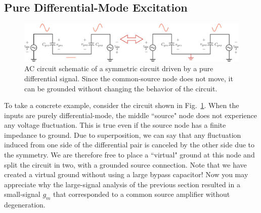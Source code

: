 \subsection{Pure Differential-Mode Excitation}
\begin{figure}[tb]
\centering
\includegraphics[width=\columnwidth]{DM_model.pdf}
\caption{AC circuit schematic of a symmetric circuit driven by a pure differential signal.  Since the common-source node does not move, it can be grounded without changing the behavior of the circuit.} \label{fig:DM_model.pdf}
\end{figure}
To take a concrete example, consider the circuit shown in Fig.~\ref{fig:DM_model.pdf}. When the inputs are purely differential-mode, the middle ``source" node does not experience any voltage fluctuation.  This is true even if the source node has a finite impedance to ground.  Due to superposition, we can say that any fluctuation induced from one side of the differential pair is canceled by the other side due to the symmetry. We are therefore free to place a ``virtual" ground at this node and split the circuit in two, with a grounded source connection.  Note that we have created a virtual ground without using a large bypass capacitor!  Now you may appreciate why the large-signal analysis of the previous section resulted in a small-signal $g_m$ that corresponded to a common source amplifier without degeneration. 

